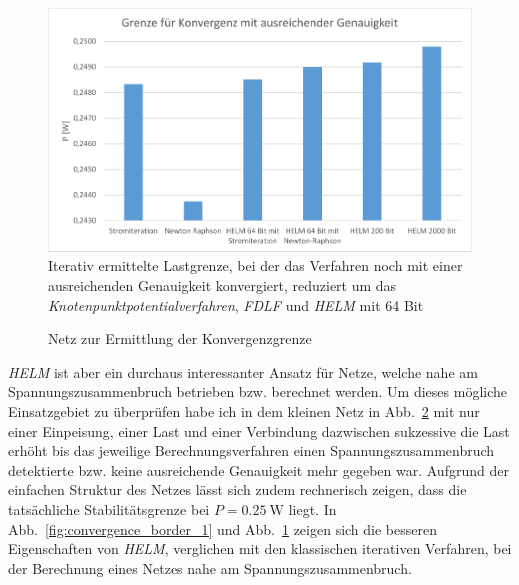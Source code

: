 \documentclass[12pt,a4paper]{article}
\newcommand{\reffig}[1]{{Abb.~\ref{fig:#1}}}
\begin{document}
	\begin{figure}
		\centering
		\includegraphics[scale=0.8]{pictures/convergence_border_2}
		\caption{Iterativ ermittelte Lastgrenze, bei der das Verfahren noch mit einer ausreichenden Genauigkeit konvergiert, reduziert um das \emph{Knotenpunktpotentialverfahren}, \emph{FDLF} und \emph{HELM} mit 64 Bit}
		\label{fig:convergence_border_2}
	\end{figure}
	
	\begin{figure}
		\centering
		
		\caption{Netz zur Ermittlung der Konvergenzgrenze}
		\label{fig:two_node_net}
	\end{figure}
	
	\emph{HELM} ist aber ein durchaus interessanter Ansatz für Netze, welche nahe am Spannungszusammenbruch betrieben bzw. berechnet werden. Um dieses mögliche Einsatzgebiet zu überprüfen habe ich in dem kleinen Netz in \reffig{two_node_net} mit nur einer Einpeisung, einer Last und einer Verbindung dazwischen sukzessive die Last erhöht bis das jeweilige Berechnungsverfahren einen Spannungszusammenbruch detektierte bzw. keine ausreichende Genauigkeit mehr gegeben war. Aufgrund der einfachen Struktur des Netzes lässt sich zudem rechnerisch zeigen, dass die tatsächliche Stabilitätsgrenze bei $P = \SI{0.25}{\watt}$ liegt. In \reffig{convergence_border_1} und \reffig{convergence_border_2} zeigen sich die besseren Eigenschaften von \emph{HELM}, verglichen mit den klassischen iterativen Verfahren, bei der Berechnung eines Netzes nahe am Spannungszusammenbruch.
	
\end{document}
